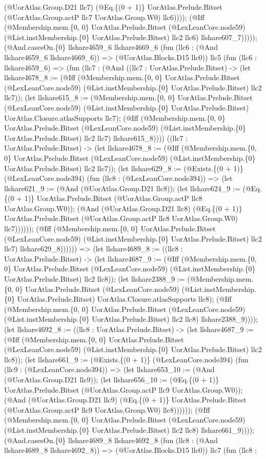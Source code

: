 \documentclass[11pt]{article}
\begin{document}
(@UorAtlas.Group.D21 llc7) (@Eq.\{(0 + 1)\} UorAtlas.Prelude.Bitset (@UorAtlas.Group.actP llc7 UorAtlas.Group.W0) llc6)))); (@Iff (@Membership.mem.\{0, 0\} UorAtlas.Prelude.Bitset (@LexLeanCore.node59) (@List.instMembership.\{0\} UorAtlas.Prelude.Bitset) llc2 llc6) llshare607\_7))))); (@And.casesOn.\{0\} llshare4659\_6 llshare4669\_6 (fun (llc6 : (@And llshare4659\_6 llshare4669\_6)) => (@UorAtlas.Blocks.D15 llc0)) llc5 (fun (llc6 : llshare4659\_6) => (fun (llc7 : (@And ((llc7 : UorAtlas.Prelude.Bitset) -> (let llshare4678\_8 := (@Iff (@Membership.mem.\{0, 0\} UorAtlas.Prelude.Bitset (@LexLeanCore.node59) (@List.instMembership.\{0\} UorAtlas.Prelude.Bitset) llc2 llc7)); (let llshare615\_8 := (@Membership.mem.\{0, 0\} UorAtlas.Prelude.Bitset (@LexLeanCore.node59) (@List.instMembership.\{0\} UorAtlas.Prelude.Bitset) UorAtlas.Closure.atlasSupports llc7); (@Iff (@Membership.mem.\{0, 0\} UorAtlas.Prelude.Bitset (@LexLeanCore.node59) (@List.instMembership.\{0\} UorAtlas.Prelude.Bitset) llc2 llc7) llshare615\_8)))) ((llc7 : UorAtlas.Prelude.Bitset) -> (let llshare4678\_8 := (@Iff (@Membership.mem.\{0, 0\} UorAtlas.Prelude.Bitset (@LexLeanCore.node59) (@List.instMembership.\{0\} UorAtlas.Prelude.Bitset) llc2 llc7)); (let llshare629\_8 := (@Exists.\{(0 + 1)\} (@LexLeanCore.node394) (fun (llc8 : (@LexLeanCore.node394)) => (let llshare621\_9 := (@And (@UorAtlas.Group.D21 llc8)); (let llshare624\_9 := (@Eq.\{(0 + 1)\} UorAtlas.Prelude.Bitset (@UorAtlas.Group.actP llc8 UorAtlas.Group.W0)); (@And (@UorAtlas.Group.D21 llc8) (@Eq.\{(0 + 1)\} UorAtlas.Prelude.Bitset (@UorAtlas.Group.actP llc8 UorAtlas.Group.W0) llc7)))))); (@Iff (@Membership.mem.\{0, 0\} UorAtlas.Prelude.Bitset (@LexLeanCore.node59) (@List.instMembership.\{0\} UorAtlas.Prelude.Bitset) llc2 llc7) llshare629\_8)))))) => (let llshare4689\_8 := ((llc8 : UorAtlas.Prelude.Bitset) -> (let llshare4687\_9 := (@Iff (@Membership.mem.\{0, 0\} UorAtlas.Prelude.Bitset (@LexLeanCore.node59) (@List.instMembership.\{0\} UorAtlas.Prelude.Bitset) llc2 llc8)); (let llshare2388\_9 := (@Membership.mem.\{0, 0\} UorAtlas.Prelude.Bitset (@LexLeanCore.node59) (@List.instMembership.\{0\} UorAtlas.Prelude.Bitset) UorAtlas.Closure.atlasSupports llc8); (@Iff (@Membership.mem.\{0, 0\} UorAtlas.Prelude.Bitset (@LexLeanCore.node59) (@List.instMembership.\{0\} UorAtlas.Prelude.Bitset) llc2 llc8) llshare2388\_9)))); (let llshare4692\_8 := ((llc8 : UorAtlas.Prelude.Bitset) -> (let llshare4687\_9 := (@Iff (@Membership.mem.\{0, 0\} UorAtlas.Prelude.Bitset (@LexLeanCore.node59) (@List.instMembership.\{0\} UorAtlas.Prelude.Bitset) llc2 llc8)); (let llshare661\_9 := (@Exists.\{(0 + 1)\} (@LexLeanCore.node394) (fun (llc9 : (@LexLeanCore.node394)) => (let llshare653\_10 := (@And (@UorAtlas.Group.D21 llc9)); (let llshare656\_10 := (@Eq.\{(0 + 1)\} UorAtlas.Prelude.Bitset (@UorAtlas.Group.actP llc9 UorAtlas.Group.W0)); (@And (@UorAtlas.Group.D21 llc9) (@Eq.\{(0 + 1)\} UorAtlas.Prelude.Bitset (@UorAtlas.Group.actP llc9 UorAtlas.Group.W0) llc8)))))); (@Iff (@Membership.mem.\{0, 0\} UorAtlas.Prelude.Bitset (@LexLeanCore.node59) (@List.instMembership.\{0\} UorAtlas.Prelude.Bitset) llc2 llc8) llshare661\_9)))); (@And.casesOn.\{0\} llshare4689\_8 llshare4692\_8 (fun (llc8 : (@And llshare4689\_8 llshare4692\_8)) => (@UorAtlas.Blocks.D15 llc0)) llc7 (fun (llc8 : 
\end{document}
